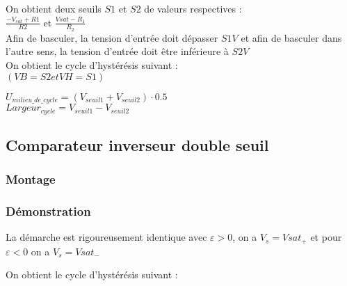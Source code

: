 On obtient deux seuils $S1$ et $S2$ de valeurs respectives : \\


$\frac{-V_{sat}+R1}{R2}$ et $\frac{Vsat - R_1}{R_2}$ \\



Afin de basculer, la tension d’entrée doit dépasser $S1 V$ et afin de basculer dans l’autre sens, la tension d’entrée doit être inférieure à $S2 V$ \\


On obtient le cycle d’hystérésis suivant : \\

$(VB=S2 et VH=S1)$




$U_{milieu\_de\_cycle}=(V_{seuil1}+V_{seuil2}) \cdot 0.5$ \\
$Largeur_{cycle}=V_{seuil1}-V_{seuil2}$



\subsection{Comparateur inverseur double seuil}

\subsubsection{Montage}


\subsubsection{Démonstration}

La démarche est rigoureusement identique avec $\varepsilon>0$, on a $V_s=Vsat_+$
et pour  $\varepsilon<0$ on a $V_s=Vsat_-$

On obtient le cycle d’hystérésis suivant : \\


